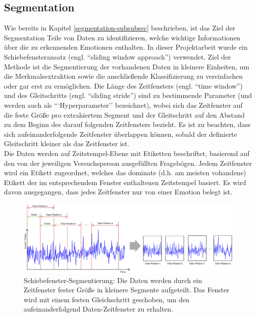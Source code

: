 \subsection{Segmentation} \label{segmenation-1-subsec}

Wie bereits in Kapitel \ref{segmentation-subsubsec} beschrieben, ist das Ziel der Segmentation Teile von Daten zu identifizieren, welche wichtige Informationen über die zu erkennenden Emotionen enthalten.
In dieser Projektarbeit wurde ein Schiebefensteransatz (engl. ``sliding window approach'') verwendet. 
Ziel der Methode ist die Segmentierung der vorhandenen Daten in kleinere Einheiten, um die Merkmalsextraktion sowie die anschließende Klassifizierung zu vereinfachen oder gar erst zu ermöglichen.
Die Länge des Zeitfensters (engl. ``time window'') und des Gleitschritts (engl. ``sliding stride'') sind zu bestimmende Parameter (und werden auch als ```Hyperparameter'' bezeichnet), wobei sich das Zeitfenster auf die feste Größe pro extrahiertem Segment und der Gleitschritt auf den Abstand zu dem Beginn des darauf folgenden Zeitfensters bezieht.
Es ist zu beachten, dass sich aufeinanderfolgende Zeitfenster überlappen können, sobald der definierte Gleitschritt kleiner als das Zeitfenster ist. \\


Die Daten werden auf Zeitstempel-Ebene mit Etiketten beschriftet, basierend auf den von der jeweiligen Versuchsperson ausgefüllten Fragebögen. 
Jedem Zeitfenster wird ein Etikett zugeordnet, welches das dominate (d.h. am meisten vohandene) Etikett der im entsprechendem Fenster enthaltenen Zeitstempel basiert. Es wird davon ausgegangen, dass jedes Zeitfenster nur von einer Emotion belegt ist. \\


\begin{figure}[h]
\includegraphics[width=\textwidth]{Images/segmentation.png} 
\caption[Schiebefenster-Segmentierung]{Schiebefenster-Segmentierung: Die Daten werden durch ein Zeitfenster fester Größe in kleinere Segmente aufgeteilt. Das Fenster wird mit einem festen Gleichschritt geschoben, um den aufeinanderfolgend Daten-Zeitfenster zu erhalten. }
\end{figure} 